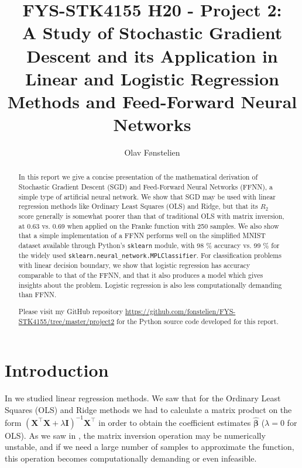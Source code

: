 \documentclass[]{article}
\title{FYS-STK4155 H20 - Project 2:\\A Study of Stochastic Gradient Descent and its Application in Linear and Logistic Regression Methods and Feed-Forward Neural Networks}
\author{Olav Fønstelien}
\begin{document}
\maketitle

\begin{abstract}

In this report we give a concise presentation of the mathematical derivation of Stochastic Gradient Descent (SGD) and Feed-Forward Neural Networks (FFNN), a simple type of artificial neural network. We show that SGD may be used with linear regression methods like Ordinary Least Squares (OLS) and Ridge, but that its $R_2$ score generally is somewhat poorer than that of traditional OLS with matrix inversion, at 0.63 vs. 0.69 when applied on the Franke function with 250 samples. We also show that a simple implementation of a FFNN performs well on the simplified MNIST dataset available through Python's \lstinline|sklearn| module, with 98 \% accuracy vs. 99 \% for the widely used \lstinline|sklearn.neural_network.MPLClassifier|. For classification problems with linear decision boundary, we show that logistic regression has accuracy comparable to that of the FFNN, and that it also produces a model which gives insights about the problem. Logistic regression is also less computationally demanding than FFNN.

Please visit my GitHub repository \url{https://github.com/fonstelien/FYS-STK4155/tree/master/project2} for the Python source code developed for this report.

\end{abstract}

\section{Introduction} \label{intro}

In \cite{project1} we studied linear regression methods. We saw that for the Ordinary Least Squares (OLS) and Ridge methods we had to calculate a matrix product on the form $(\mathbf{X}^\intercal \mathbf{X} + \lambda \mathbf{I})^{-1} \mathbf{X}^\intercal$ in order to obtain the coefficient estimates $\mathbf{\hat{\beta}}$ ($\lambda = 0$ for OLS). As we saw in \cite{project1}, the matrix inversion operation may be numerically unstable, and if we need a large number of samples to approximate the function, this operation becomes computationally demanding or even infeasible. 
\end{document}
